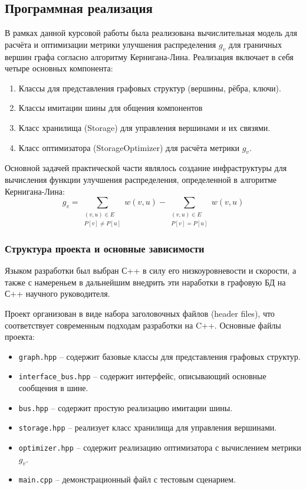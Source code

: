 \subsection{Программная реализация}

В рамках данной курсовой работы была реализована вычислительная модель для расчёта и оптимизации метрики улучшения распределения $g_v$ для граничных вершин графа согласно алгоритму Кернигана-Лина. Реализация включает в себя четыре основных компонента:
\begin{enumerate}
    \item Классы для представления графовых структур (вершины, рёбра, ключи).
    \item Классы имитации шины для общения компонентов
    \item Класс хранилища (Storage) для управления вершинами и их связями.
    \item Класс оптимизатора (StorageOptimizer) для расчёта метрики $g_v$.
\end{enumerate}

Основной задачей практической части являлось создание инфраструктуры для вычисления функции улучшения распределения, определенной в алгоритме Кернигана-Лина:
$$
g_v = \sum_{\substack{(v,u) \in E \\ P[v] \neq P[u]}} w(v,u) - \sum_{\substack{(v,u) \in E \\ P[v] = P[u]}} w(v,u)
$$

\subsubsection{Структура проекта и основные зависимости}

Языком разработки был выбран С++ в силу его низкоуровневости и скорости, а также с намереньем в дальнейшим внедрить эти наработки в графовую БД на С++ научного руководителя.

Проект организован в виде набора заголовочных файлов (header files), что соответствует современным подходам разработки на C++. Основные файлы проекта:

\begin{itemize}
    \item \texttt{graph.hpp} -- содержит базовые классы для представления графовых структур.
    \item \texttt{interface\_bus.hpp} -- содержит интерфейс, описывающий основные сообщения в шине.
    \item \texttt{bus.hpp} -- содержит простую реализацию имитации шины.
    \item \texttt{storage.hpp} -- реализует класс хранилища для управления вершинами.
    \item \texttt{optimizer.hpp} -- содержит реализацию оптимизатора с вычислением метрики $g_v$.
    \item \texttt{main.cpp} -- демонстрационный файл с тестовым сценарием.
\end{itemize}

